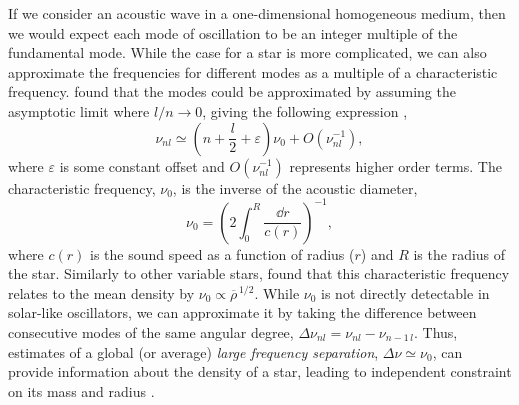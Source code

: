 If we consider an acoustic wave in a one-dimensional homogeneous medium, then we would expect each mode of oscillation to be an integer multiple of the fundamental mode. While the case for a star is more complicated, we can also approximate the frequencies for different modes as a multiple of a characteristic frequency. \citet{Tassoul1980} found that the modes could be approximated by assuming the asymptotic limit where \(l/n \rightarrow 0\), giving the following expression \citep[cf.][]{Gough1986},
%
\begin{equation}
    \nu_{nl} \simeq \left(n + \frac{l}{2} + \varepsilon\right) \nu_0 + O(\nu_{nl}^{-1}), \label{eq:asy}
\end{equation}
%
where \(\varepsilon\) is some constant offset and \(O(\nu_{nl}^{-1})\) represents higher order terms. The characteristic frequency, \(\nu_0\), is the inverse of the acoustic diameter,
%
\begin{equation}
    \nu_0 = \left(2 \int_{0}^{R} \frac{\dd r}{c(r)}\right)^{-1},
\end{equation}
%
where \(c(r)\) is the sound speed as a function of radius (\(r\)) and \(R\) is the radius of the star. Similarly to other variable stars, \citet{Ulrich1986} found that this characteristic frequency relates to the mean density by \(\nu_0 \propto \overline{\rho}^{\,1/2}\). While \(\nu_0\) is not directly detectable in solar-like oscillators, we can approximate it by taking the difference between consecutive modes of the same angular degree, \(\Delta\nu_{nl} = \nu_{nl} - \nu_{n-1\,l}\). Thus, estimates of a global (or average) \emph{large frequency separation}, \(\Delta\nu \simeq \nu_0\), can provide information about the density of a star, leading to independent constraint on its mass and radius \needcite.

